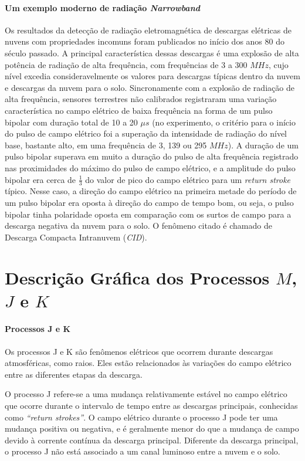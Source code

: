 \documentclass[a4paper, 12pt, onecolumn,singlespacing]{article}
\begin{document}
		\paragraph{Um exemplo moderno de radiação \textit{Narrowband}} Os resultados da detecção de radiação eletromagnética de descargas elétricas de nuvens com propriedades incomuns foram publicados no início dos anos 80 do século passado\cite{IUDIN_2015}. A principal característica dessas descargas é uma explosão de alta potência de radiação de alta frequência, com frequências de 3 a 300 $MHz$, cujo nível excedia consideravelmente os valores para descargas típicas dentro da nuvem e descargas da nuvem para o solo. Sincronamente com a explosão de radiação de alta frequência, sensores terrestres não calibrados registraram uma variação característica no campo elétrico de baixa frequência na forma de um pulso bipolar com duração total de 10 a 20 $\mu s$ (no experimento, o critério para o início do pulso de campo elétrico foi a superação da intensidade de radiação do nível base, bastante alto, em uma frequência de 3, 139 ou 295 $MHz$). A duração de um pulso bipolar superava em muito a duração do pulso de alta frequência registrado nas proximidades do máximo do pulso de campo elétrico, e a amplitude do pulso bipolar era cerca de $\frac{1}{3}$ do valor de pico do campo elétrico para um \textit{return stroke} típico. Nesse caso, a direção do campo elétrico na primeira metade do período de um pulso bipolar era oposta à direção do campo de tempo bom, ou seja, o pulso bipolar tinha polaridade oposta em comparação com os surtos de campo para a descarga negativa da nuvem para o solo. O fenômeno citado é chamado de Descarga Compacta Intranuvem (\textit{CID}). 
		
	\section{Descrição Gráfica dos Processos $M$, $J$ e $K$}
	
	\paragraph{Processos J e K}
	Os processos J e K são fenômenos elétricos que ocorrem durante descargas atmosféricas, como raios. Eles estão relacionados às variações do campo elétrico entre as diferentes etapas da descarga.
	
	O processo J refere-se a uma mudança relativamente estável no campo elétrico que ocorre durante o intervalo de tempo entre as descargas principais, conhecidas como \textit{``return strokes''}. O campo elétrico durante o processo J pode ter uma mudança positiva ou negativa, e é geralmente menor do que a mudança de campo devido à corrente contínua da descarga principal. Diferente da descarga principal, o processo J não está associado a um canal luminoso entre a nuvem e o solo.
	
\end{document}
